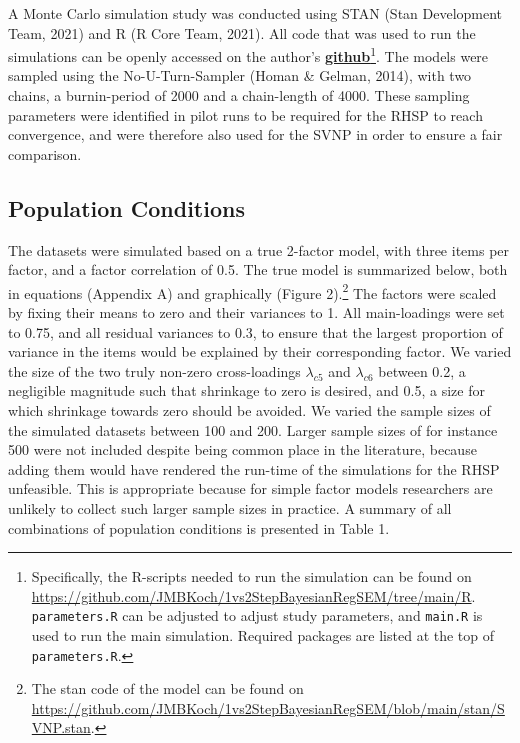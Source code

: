 \documentclass[
  man, donotrepeattitle,floatsintext]{apa6}
\begin{document}
A Monte Carlo simulation study was conducted using STAN (Stan Development Team, 2021) and R (R Core Team, 2021). All code that was used to run the simulations can be openly accessed on the author's \href{https://github.com/JMBKoch/1vs2StepBayesianRegSEM}{\textbf{github}}\footnote{Specifically, the R-scripts needed to run the simulation can be found on \url{https://github.com/JMBKoch/1vs2StepBayesianRegSEM/tree/main/R}. \texttt{parameters.R} can be adjusted to adjust study parameters, and \texttt{main.R} is used to run the main simulation. Required packages are listed at the top of \texttt{parameters.R}.}. The models were sampled using the No-U-Turn-Sampler (Homan \& Gelman, 2014), with two chains, a burnin-period of 2000 and a chain-length of 4000. These sampling parameters were identified in pilot runs to be required for the RHSP to reach convergence, and were therefore also used for the SVNP in order to ensure a fair comparison.

\hypertarget{population-conditions}{%
\subsection{Population Conditions}\label{population-conditions}}

The datasets were simulated based on a true 2-factor model, with three items per factor, and a factor correlation of 0.5. The true model is summarized below, both in equations (Appendix A) and graphically (Figure 2).\footnote{The stan code of the model can be found on \url{https://github.com/JMBKoch/1vs2StepBayesianRegSEM/blob/main/stan/SVNP.stan}.} The factors were scaled by fixing their means to zero and their variances to 1. All main-loadings were set to 0.75, and all residual variances to 0.3, to ensure that the largest proportion of variance in the items would be explained by their corresponding factor. We varied the size of the two truly non-zero cross-loadings \(\lambda_{c 5}\) and \(\lambda_{c 6}\) between 0.2, a negligible magnitude such that shrinkage to zero is desired, and 0.5, a size for which shrinkage towards zero should be avoided. We varied the sample sizes of the simulated datasets between 100 and 200. Larger sample sizes of for instance 500 were not included despite being common place in the literature, because adding them would have rendered the run-time of the simulations for the RHSP unfeasible. This is appropriate because for simple factor models researchers are unlikely to collect such larger sample sizes in practice. A summary of all combinations of population conditions is presented in Table 1.
\end{document}
